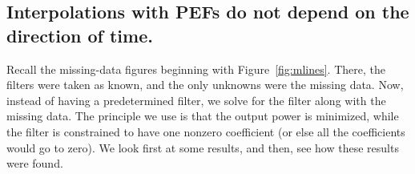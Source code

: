 %





\subsection{Interpolations with PEFs do not depend on the direction of time.}
Recall the missing-data figures beginning with Figure~\ref{fig:mlines}.
There, the filters were taken as known,
and the only unknowns were the missing data.
Now, instead of having a predetermined filter,
we solve for the filter along with the missing data.
The principle we use is that the output power is minimized,
while the filter is constrained to have one nonzero coefficient
(or else all the coefficients would go to zero).
We look first at some results, and then, see how these results were found.

